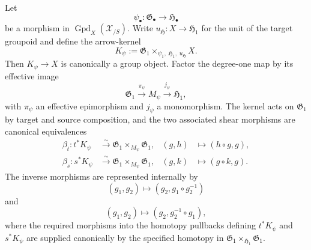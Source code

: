 \begin{theorem}
\label{thm:kernel-bitorsor}
Let
\[
    \psi_\bullet:
    \mathfrak G_\bullet
    \longrightarrow
    \mathfrak H_\bullet
\]
be a morphism in
$\operatorname{Gpd}_X(\mathcal X_{/S})$.  Write
$u_{\mathfrak H}:X\to\mathfrak H_1$ for the unit of the target groupoid and
define the arrow-kernel
\[
    K_\psi
    :=
    \mathfrak G_1
    \times_{\psi_1,\;\mathfrak H_1,\;u_{\mathfrak H}}
    X.
\]
Then $K_\psi\to X$ is canonically a group object.  Factor the degree-one map
by its effective image
\[
    \mathfrak G_1
    \xrightarrow{\pi_\psi}
    M_\psi
    \xrightarrow{j_\psi}
    \mathfrak H_1,
\]
with $\pi_\psi$ an effective epimorphism and $j_\psi$ a monomorphism.  The
kernel acts on $\mathfrak G_1$ by target and source composition, and the two
associated shear morphisms are canonical equivalences
\[
\begin{aligned}
    \beta_t:
    t^*K_\psi
    &\xrightarrow{\sim}
    \mathfrak G_1\times_{M_\psi}\mathfrak G_1,
    &
    (g,h)&\longmapsto(h\circ g,g),\\
    \beta_s:
    s^*K_\psi
    &\xrightarrow{\sim}
    \mathfrak G_1\times_{M_\psi}\mathfrak G_1,
    &
    (g,k)&\longmapsto(g\circ k,g).
\end{aligned}
\]
The inverse morphisms are represented internally by
\[
    (g_1,g_2)
    \longmapsto
    (g_2,g_1\circ g_2^{-1})
\]
and
\[
    (g_1,g_2)
    \longmapsto
    (g_2,g_2^{-1}\circ g_1),
\]
where the required morphisms into the homotopy pullbacks defining
$t^*K_\psi$ and $s^*K_\psi$ are supplied canonically by the specified
homotopy in
$\mathfrak G_1\times_{\mathfrak H_1}\mathfrak G_1$.
\end{theorem}

